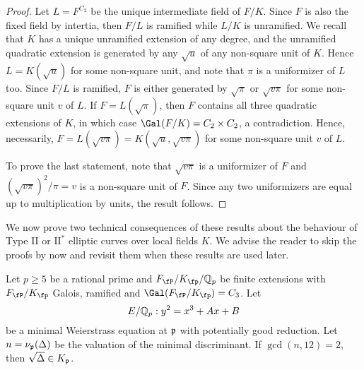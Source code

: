 \begin{proof}
    Let $L=F^{C_2}$ be the unique intermediate field of $F/K$. Since $F$ is also the fixed field by intertia, then $F/L$ is ramified while $L/K$ is unramified. We recall that $K$ has a unique unramified extension of any degree, and the unramified quadratic extension is generated by any $\sqrt{u}$ of any non-square unit of $K$. Hence $L=K(\sqrt{u})$ for some non-square unit, and note that $\pi$ is a uniformizer of $L$ too. Since $F/L$ is ramified, $F$ is either generated by $\sqrt{\pi}$ or $\sqrt{v\pi}$ for some non-square unit $v$ of $L$. If $F=L(\sqrt{\pi})$, then $F$ contains all three quadratic extensions of $K$, in which case $\Gal(F/K)=C_2\times C_2$, a contradiction. Hence, necessarily, $F=L(\sqrt{v\pi})=K(\sqrt{u},\sqrt{v\pi})$ for some non-square unit $v$ of $L$.

    To prove the last statement, note that $\sqrt{v\pi}$ is a uniformizer of $F$ and $(\sqrt{v\pi})^2/\pi=v$ is a non-square unit of $F$. Since any two uniformizers are equal up to multiplication by units, the result follows. 
\end{proof}

We now prove two technical consequences of these results about the behaviour of Type II or $\mathrm{II}^*$ elliptic curves over local fields $K$. We advise the reader to skip the proofs by now and revisit them when these results are used later.

\begin{lemma}\label{lem_nottwo}
    Let $p\geq 5$ be a rational prime and $F_\fP/K_\fp/\QQ_p$ be finite extensions with $F_\fP/K_\fp$ Galois, ramified and $\Gal(F_\fP/K_\fp)=C_3$. Let $$E/\mathbb{Q}_p:y^2=x^3+Ax+B$$ be a minimal Weierstrass equation at $\mathfrak{p}$ with potentially good reduction. Let $n=\nu_{\mathfrak{p}}(\Delta)$ be the valuation of the minimal discriminant. If $\gcd(n,12)=2$, then $\sqrt{\Delta}\in K_{\mathfrak{p}}$.
\end{lemma}

